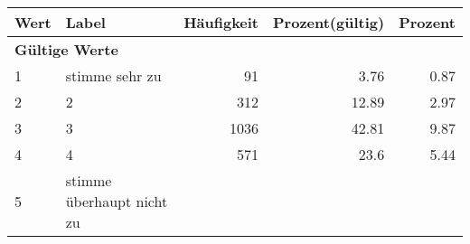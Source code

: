      \begin{longtable}{lXrrr}
     \toprule
     \textbf{Wert} & \textbf{Label} & \textbf{Häufigkeit} & \textbf{Prozent(gültig)} & \textbf{Prozent} \\
     \endhead
     \midrule
     \multicolumn{5}{l}{\textbf{Gültige Werte}}\\

     1 &
     \multicolumn{1}{X}{ stimme sehr zu   } &


       \num{91} &
       \num[round-mode=places,round-precision=2]{3,76} &
         \num[round-mode=places,round-precision=2]{0,87} \\

     2 &
     \multicolumn{1}{X}{ 2   } &


       \num{312} &
       \num[round-mode=places,round-precision=2]{12,89} &
         \num[round-mode=places,round-precision=2]{2,97} \\

     3 &
     \multicolumn{1}{X}{ 3   } &


       \num{1036} &
       \num[round-mode=places,round-precision=2]{42,81} &
         \num[round-mode=places,round-precision=2]{9,87} \\

     4 &
     \multicolumn{1}{X}{ 4   } &


       \num{571} &
       \num[round-mode=places,round-precision=2]{23,6} &
         \num[round-mode=places,round-precision=2]{5,44} \\

     5 &
     \multicolumn{1}{X}{ stimme überhaupt nicht zu   } &



\end{longtable}
